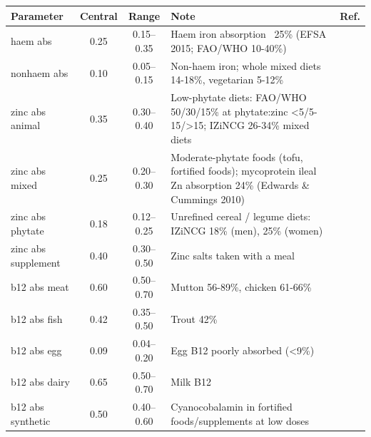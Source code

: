 \begin{tabular}{lcc>{\raggedright\arraybackslash}p{6.3cm}l}
\toprule
Parameter & Central & Range & Note & Ref. \\
\midrule
haem abs & 0.25 & 0.15--0.35 & Haem iron absorption ~25\% (EFSA 2015; FAO/WHO 10-40\%) & \cite{efsa2015iron} \\
nonhaem abs & 0.10 & 0.05--0.15 & Non-haem iron; whole mixed diets 14-18\%, vegetarian 5-12\% & \cite{hurrell2010} \\
zinc abs animal & 0.35 & 0.30--0.40 & Low-phytate diets: FAO/WHO 50/30/15\% at phytate:zinc <5/5-15/>15; IZiNCG 26-34\% mixed diets & \cite{fao2004vitmin} \\
zinc abs mixed & 0.25 & 0.20--0.30 & Moderate-phytate foods (tofu, fortified foods); mycoprotein ileal Zn absorption 24\% (Edwards \& Cummings 2010) & \cite{efsa2014zinc} \\
zinc abs phytate & 0.18 & 0.12--0.25 & Unrefined cereal / legume diets: IZiNCG 18\% (men), 25\% (women) & \cite{izincg2004} \\
zinc abs supplement & 0.40 & 0.30--0.50 & Zinc salts taken with a meal & \cite{efsa2014zinc} \\
b12 abs meat & 0.60 & 0.50--0.70 & Mutton 56-89\%, chicken 61-66\% & \cite{watanabe2007} \\
b12 abs fish & 0.42 & 0.35--0.50 & Trout 42\% & \cite{watanabe2007} \\
b12 abs egg & 0.09 & 0.04--0.20 & Egg B12 poorly absorbed (<9\%) & \cite{watanabe2007} \\
b12 abs dairy & 0.65 & 0.50--0.70 & Milk B12 & \cite{watanabe2007} \\
b12 abs synthetic & 0.50 & 0.40--0.60 & Cyanocobalamin in fortified foods/supplements at low doses & \cite{watanabe2007} \\
\bottomrule
\end{tabular}
